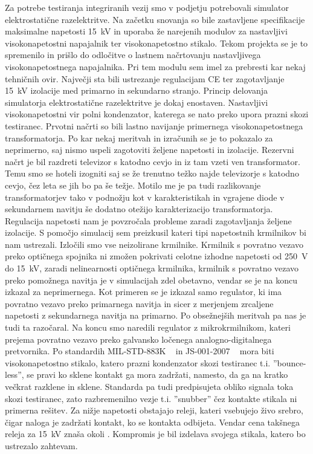 \documentclass[a4paper,twoside,openright,12pt,Slovene]{book}
\begin{document}
Za potrebe testiranja integriranih vezij smo v podjetju potrebovali simulator elektrostatične razelektritve. Na začetku snovanja so bile zastavljene specifikacije maksimalne napetosti \SI{15}{\kilo\volt} in uporaba že narejenih modulov za nastavljivi visokonapetostni napajalnik ter visokonapetostno stikalo. Tekom projekta se je to spremenilo in prišlo do odločitve o lastnem načrtovanju nastavljivega visokonapetostnega napajalnika. Pri tem modulu sem imel za prebresti kar nekaj tehničnih ovir. Največji sta bili ustrezanje regulacijam CE ter zagotavljanje \SI{15}{\kilo\volt} izolacije med primarno in sekundarno stranjo.   
Princip delovanja simulatorja elektrostatične razelektritve je dokaj enostaven. Nastavljivi visokonapetostni vir polni kondenzator, katerega se nato preko upora prazni skozi testiranec.    
Prvotni načrti so bili lastno navijanje primernega visokonapetostnega transformatorja. Po kar nekaj meritvah in izračunih se je to pokazalo za neprimerno, saj nismo uspeli zagotoviti željene napetosti in izolacije. Rezervni načrt je bil razdreti televizor s katodno cevjo in iz tam vzeti ven transformator. Temu smo se hoteli izogniti saj se že trenutno težko najde televizorje s katodno cevjo, čez leta se jih bo pa še težje. Motilo me je pa tudi razlikovanje transformatorjev tako v podnožju kot v karakteristikah in vgrajene diode v sekundarnem navitju še dodatno otežijo karakterizacijo transformatorja. 
Regulacija napetosti nam je povzročala probleme zaradi zagotavljanja željene izolacije. S pomočjo simulacij sem preizkusil kateri tipi napetostnih krmilnikov bi nam ustrezali. Izločili smo vse neizolirane krmilnike. Krmilnik s povratno vezavo preko optičnega spojnika ni zmožen pokrivati celotne izhodne napetosti od \SI{250}{\volt} do \SI{15}{\kilo\volt}, zaradi nelinearnosti optičnega krmilnika, krmilnik s povratno vezavo preko pomožnega navitja je v simulacijah zdel obetavno, vendar se je na koncu izkazal za neprimernega. Kot primeren se je izkazal samo regulator, ki ima povratno vezavo preko primarnega navitja in sicer z merjenjem zrcaljene napetosti z sekundarnega navitja na primarno. Po obsežnejših meritvah pa nas je tudi ta razočaral. Na koncu smo naredili regulator z mikrokrmilnikom, kateri prejema povratno vezavo preko galvansko ločenega analogno-digitalnega pretvornika.
Po standardih MIL-STD-883K ~\cite{MIL-STD-883K} in JS-001-2007 ~\cite{JS-001-2017} mora biti visokonapetostno stikalo, katero prazni kondenzator skozi testiranec t.i. ''bounce-less'', se pravi ko sklene kontakt ga mora zadržati, namesto, da ga na kratko večkrat razklene in sklene. Standarda pa tudi predpisujeta obliko signala toka skozi testiranec, zato razbremenilno vezje t.i. ''snubber'' čez kontakte stikala ni primerna rešitev. Za nižje napetosti obstajajo releji, kateri vsebujejo živo srebro, čigar naloga je zadržati kontakt, ko se kontakta odbijeta. Vendar cena takšnega releja za \SI{15}{\kilo\volt} znaša okoli .
Kompromis je bil izdelava svojega stikala, katero bo ustrezalo zahtevam.
\end{document}
